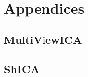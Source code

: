 \documentclass[ twoside,openright,titlepage,numbers=noenddot,%
                headinclude,footinclude,cleardoublepage=empty,abstract=on,
                BCOR=5mm,paper=a4,fontsize=11pt, 
                ]{scrreprt}
\begin{document}
% 

\cleardoublepage

\appendix
\part{Appendices}
\chapter{MultiViewICA}

\chapter{ShICA}


\end{document}
